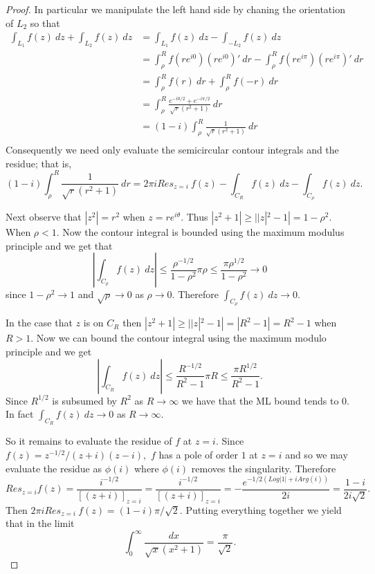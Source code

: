 \documentclass[11pt]{amsart}
\theoremstyle{definition}
\numberwithin{theorem}{section}
\numberwithin{definition}{section}
\numberwithin{equation}{section}
\begin{document}
\begin{proof}
	In particular we manipulate the left hand side by chaning the orientation of $L_2$ so that
	\begin{equation*}
	\begin{aligned}
		\int_{L_1} f(z)\ dz  + \int_{L_2} f(z)\ dz &= \int_{L_1} f(z)\ dz  - \int_{-L_2} f(z)\ dz\\
		&= \int_\rho^R f(re^{i0})(re^{i0})'\ dr - \int_\rho^R f(re^{i\pi})(re^{i\pi})'\ dr \\
		&= \int_\rho^R f(r)\ dr + \int_\rho^R f(-r)\ dr \\
		&= \int_\rho^R \frac{e^{-i0/2}+ e^{-i\pi/2}}{\sqrt{r}(r^2 + 1)}\ dr \\
		&= (1 -i)\int_\rho^R \frac{1}{\sqrt{r}(r^2 + 1)}\ dr \\
	\end{aligned}
	\end{equation*}
	Consequently we need only evaluate the semicircular contour integrals and the residue; that is,
	\begin{equation*}
		(1 -i)\int_\rho^R \frac{1}{\sqrt{r}(r^2 + 1)}\ dr  =  2\pi i Res_{z = i}\ f(z) -\int_{C_R} f(z)\ dz  -\int_{C_\rho} f(z)\ dz.
	\end{equation*}


	Next observe that $|z^2| = r^2$ when $z = re^{i\theta}.$ Thus $|z^2 + 1| \geq ||z|^2 -1| = 1- \rho^2$. When $\rho < 1.$ Now the contour integral is bounded using the maximum modulus principle and we get that
	\begin{equation*}
		\left|\int_{C_\rho} f(z)\ dz\right| \leq \frac{\rho^{-1/2}}{1 - \rho^2} \pi \rho \leq \frac{\pi \rho^{1/2}}{1 - \rho^2} \to 0
	\end{equation*}
	since $1- \rho^2 \to 1$ and $\sqrt{\rho} \to 0$ as $\rho \to 0.$ Therefore  $\int_{C_\rho} f(z)\ dz \to 0.$
	
	In the case that $z$ is on $C_R$ then $|z^2 + 1| \geq ||z|^2 - 1| = |R^2 - 1| = R^2 -1$ when $R > 1.$ Now we can bound the contour integral using the maximum modulo principle and we get
	\begin{equation*}
		\left|\int_{C_R} f(z)\ dz\right| \leq \frac{R^{-1/2}}{R ^2-1} \pi R \leq \frac{\pi R^{1/2}}{R^2 - 1}.
	\end{equation*}
	Since $R^{1/2}$ is subsumed by $R^2$ as $R \to \infty$ we have that the ML bound tends to $0$. In fact
	$\int_{C_R} f(z)\ dz \to 0$ as $R \to \infty. $


	So it remains to evaluate the residue of $f$ at $z = i$. Since $f(z) = z^{-1/2}/(z+i)(z-i),$ $f$ has a
	pole of order $1$ at $z = i$ and so we may evaluate the residue as $\phi(i)$ where $\phi(i)$ removes the singularity. Therefore
	$$
	 Res_{z =i} f(z) = \frac{i^{-1/2}}{[(z+i)]_{z = i}} = \frac{i^{-1/2}}{[(z+i)]_{z = i}} = -\frac{e^{-1/2 (Log|1| + iArg(i))}}{2i}= \frac{1-i}{2i\sqrt{2}}.$$
	 Then $2 \pi i Res_{z= i}\ f(z) = (1-i)\pi/\sqrt{2}$. Putting everything together we yield that in the limit
	 \begin{equation*}
	\int_0^\infty \frac{dx}{\sqrt{x} (x^2 + 1)} = \frac{\pi}{\sqrt{2}}. 
	 \end{equation*}
\end{proof}
\end{document}
